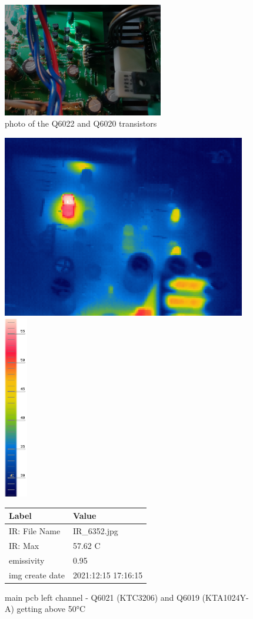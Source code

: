 \documentclass[a4paper,twoside]{report}
\begin{document}
\begin{figure}[hptb!]
 \centering
 \includegraphics[width=7cm, keepaspectratio=true]{img_report/main_pcb_r.png}
 \caption{photo of the Q6022 and Q6020 transistors}
\end{figure}



\begin{figure}[hptb!]
 \centering
 \includegraphics[height=8cm, keepaspectratio=true]{img_report/IR_6352}
 \includegraphics[height=8cm, keepaspectratio=true]{img_report/IR_6352_scale}

 \vspace*{5mm}
 \begin{tabular}{ l | l }
  Label & Value \\ \hline
  IR: File Name & IR\_6352.jpg \\
  IR: Max & 57.62 C \\
  emissivity & 0.95 \\
  img create date & 2021:12:15 17:16:15
 \end{tabular}
 \caption{main pcb left channel - Q6021 (KTC3206) and Q6019 (KTA1024Y-A) getting above 50\si{\celsius}}
 \label{tab:main-pcb-l-ir}
\end{figure}
\end{document}
